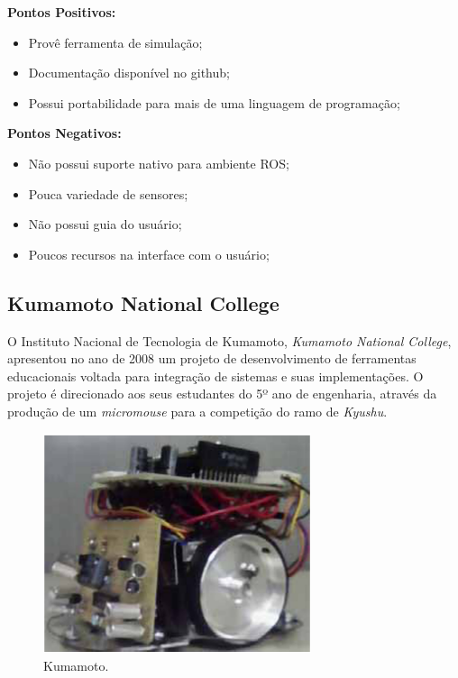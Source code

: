 \textbf{Pontos Positivos:}
\begin{itemize}
	\item Provê ferramenta de simulação;
	\item Documentação disponível no github;
	\item Possui portabilidade para mais de uma linguagem de programação; 
\end{itemize}

\textbf{Pontos Negativos:}
\begin{itemize}
	\item Não possui suporte nativo para ambiente ROS;
	\item Pouca variedade de sensores;
	\item Não possui guia do usuário;
	\item Poucos recursos na interface com o usuário;
\end{itemize}


\subsection{Kumamoto National College}
\hspace{0.5cm} O Instituto Nacional de Tecnologia de Kumamoto, \textit{Kumamoto National College}, apresentou no ano de 2008 um projeto de desenvolvimento de ferramentas educacionais voltada para integração de sistemas e suas implementações. O projeto é direcionado aos seus estudantes do 5º ano de engenharia, através da produção de um \textit{micromouse} para a competição do ramo de \textit{Kyushu}.

\begin{figure}[H]
	\centering
	\includegraphics[width=0.7\textwidth]
	{Figures/Kumamoto_model.png}
	\caption{\label{fig:Kumamoto_model} Kumamoto.}
	\end{figure}

